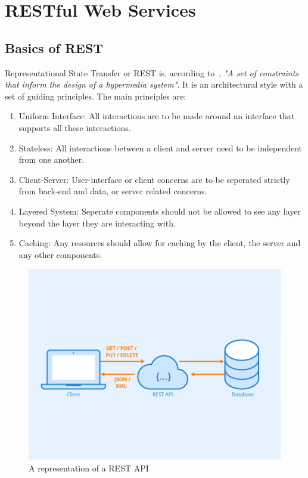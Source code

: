 
\section{RESTful Web Services}


\subsection{Basics of REST}
Representational State Transfer or REST is, according to~\textcite{Wilde2011}, \emph{"A set of constraints that inform the design of a hypermedia system"}. It is an architectural style with a set of guiding principles. The main principles are: 
\begin{enumerate}
	\item Uniform Interface: All interactions are to be made around an interface that supports all these interactions.
	\item  Stateless: All interactions between a client and server need to be independent from one another.
	\item Client-Server: User-interface or client concerns are to be seperated strictly from back-end and data, or server related concerns.
	\item Layered System: Seperate components should not be allowed to see any layer beyond the layer they are interacting with.
	\item Caching: Any resources should allow for caching by the client, the server and any other components.
\end{enumerate}

\begin{figure}
	\centering
	\includegraphics{./img/Rest-API.png}
	\caption[REST API]{A representation of a REST API ~\autocite{Seobility}}
\end{figure}

